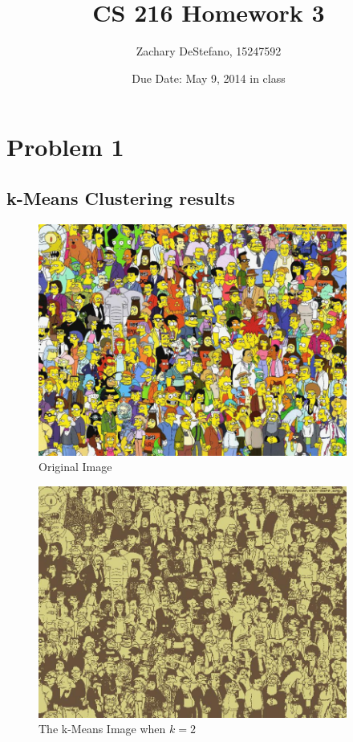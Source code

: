 \documentclass[11pt,psfig]{article}
\begin{document}
\setlength{\parskip}{1.2ex plus0.3ex minus 0.3ex}


\thispagestyle{empty} \pagestyle{myheadings} 



\title{CS 216 Homework 3}
\author{Zachary DeStefano, 15247592}
\date{Due Date: May 9, 2014 in class}

\maketitle

\vfill\eject

\newpage

\section*{Problem 1}

\subsection*{k-Means Clustering results}

\begin{figure}[H]
\centering
\includegraphics[height=3in]{simpsons.jpg}
\caption{Original Image}
\end{figure}

\begin{figure}[H]
\centering
\includegraphics[height=3in]{2-means_simpsons.jpg}
\caption{The k-Means Image when $k=2$}
\end{figure}
\end{document}

